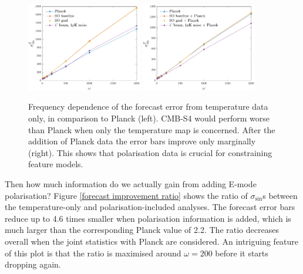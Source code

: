 \begin{figure}[ht]
	\centering
	\includegraphics[width=0.45\textwidth]{omega_dependence_T.pdf}
	\includegraphics[width=0.45\textwidth]{omega_dependence_combined_T.pdf}
	\caption{Frequency dependence of the forecast error from temperature data only, in comparison to Planck (left). CMB-S4 would perform worse than Planck when only the temperature map is concerned. After the addition of Planck data the error bars improve only marginally (right). This shows that polarisation data is crucial for constraining feature models.}
	\label{forecast omega dependence T}
\end{figure}

Then how much information do we actually gain from adding E-mode polarisation? Figure \ref{forecast improvement ratio} shows the ratio of $\sigma_{\sin}$s between the temperature-only and polarisation-included analyses. The forecast error bars reduce up to 4.6 times smaller when polarisation information is added, which is much larger than the corresponding Planck value of 2.2. The ratio decreases overall when the joint statistics with Planck are considered. An intriguing feature of this plot is that the ratio is maximised around $\omega=200$ before it starts dropping again.

